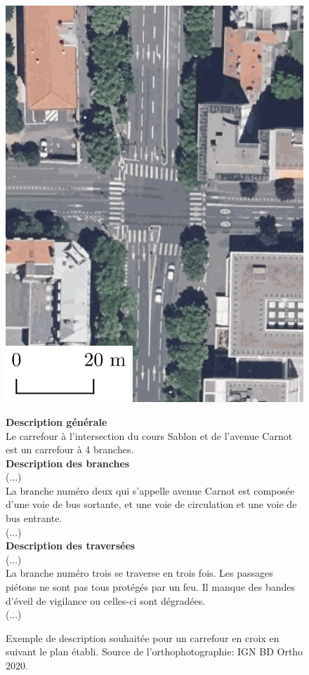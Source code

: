 \begin{figure}[ht]
    \begin{minipage}[b]{0.45\linewidth}
        \centering
        \includegraphics[width=0.6\linewidth]{images/experimentation/ortho_carrefour.png} 
    \end{minipage}
    \begin{minipage}[b]{0.45\linewidth}
        \scriptsize
        \textbf{Description générale}\\
        Le carrefour à l'intersection du cours Sablon et de l'avenue Carnot est un carrefour à 4 branches.\\
        \textbf{Description des branches}\\
        (...)\\
        La branche numéro deux qui s'appelle avenue Carnot est composée d'une voie de bus sortante, et une voie de circulation et une voie de bus entrante.\\
        (...)\\
        \textbf{Description des traversées}\\
        (...)\\
        La branche numéro trois se traverse en trois fois. Les passages piétons ne sont pas tous protégés par un feu. Il manque des bandes d'éveil de vigilance ou celles-ci sont dégradées.\\
        (...)\\
    \end{minipage}
    \caption[Exemple de description de carrefour]{Exemple de description souhaitée pour un carrefour en croix en suivant le plan établi. Source de l'orthophotographie: IGN BD Ortho 2020.}
    \label{fig:experimentation_plan_description}
\end{figure}

